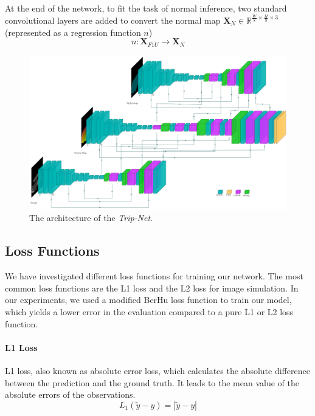At the end of the network, to fit the task of normal inference, two standard convolutional layers are added to convert the normal map $ \textbf{X}_{N} \in \mathbb{R}^{\frac{W}{8}\times \frac{H}{8}\times 3} $ (represented as a regression function $ n $)
\[n:\textbf{X}_{F1U} \rightarrow \textbf{X}_{N} \] 

\begin{figure}
	\centering
	\captionsetup{width=\linewidth}
	\includegraphics[width=\textwidth]{Figures/trignet} %
	\decoRule
	\caption{The architecture of the \textit{Trip-Net}.}
	\label{fig:Trip-Net}
\end{figure}




\subsection{Loss Functions}
We have investigated different loss functions for training our network. The most common loss functions are the L1 loss and the L2 loss for image simulation. In our experiments, we used a modified BerHu loss function to train our model, which yields a lower error in the evaluation compared to a pure L1 or L2 loss function. 

\paragraph{L1 Loss}
L1 loss, also known as absolute error loss, which calculates the absolute difference between the prediction and the ground truth. It leads to the mean value of the absolute errors of the observations.
\[ L_1(\tilde y - y) = |\tilde y - y | \]

